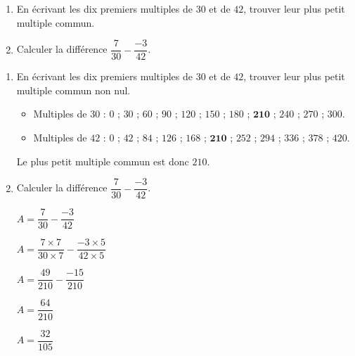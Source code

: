 \begin{exercice*}
    \begin{enumerate}
        \item En écrivant les dix premiers multiples de $30$ et de $42$, trouver leur plus petit multiple commun.
        \smallskip
        \item Calculer la différence $\dfrac{7}{30}-\dfrac{-3}{42}$.
    \end{enumerate}
\end{exercice*}
\begin{corrige}
    \begin{enumerate}
        \item En écrivant les dix premiers multiples de $30$ et de $42$, trouver leur plus petit multiple commun non nul.        
        \begin{itemize}
            \item Multiples de $30$ : $0$ ; $30$ ; $60$ ; $90$ ; $120$ ; $150$ ; $180$ ; $\mathbf{210}$ ; $240$ ; $270$ ; $300$.
            \item Multiples de $42$ : $0$ ; $42$ ; $84$ ; $126$ ; $168$ ; $\mathbf{210}$ ; $252$ ; $294$ ; $336$ ; $378$ ; $420$.
        \end{itemize}
        Le plus petit multiple commun est donc $210$.
        \smallskip
        \item Calculer la différence $\dfrac{7}{30}-\dfrac{-3}{42}$.        
        \begin{spacing}{2}
            \begin{multicols}{2}            
                $A = \dfrac{7}{30}-\dfrac{-3}{42}$

                $A = \dfrac{7\times 7}{30\times 7}-\dfrac{-3\times 5}{42\times 5}$

                $A = \dfrac{49}{210}-\dfrac{-15}{210}$

                $A = \dfrac{64}{210}$
                
                $A = \dfrac{32}{105}$            
            \end{multicols}
        \end{spacing}
    \end{enumerate}
\end{corrige}

